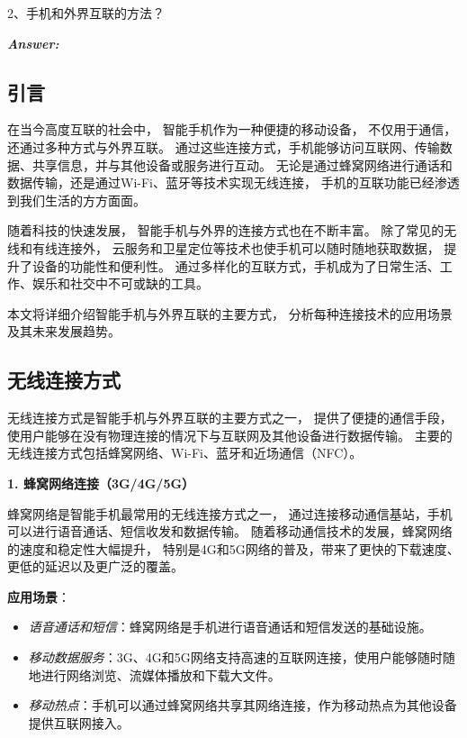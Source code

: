 \documentclass[12pt]{article}
\newenvironment{Answer}{
  \vspace{12pt}
  {\large\textbf{\textit{\hspace{-12pt}Answer:}}}\par
  \vspace{8pt}
} {\vspace{24pt}}
\begin{document}
\begin{question}{}{}
2、手机和外界互联的方法？
\end{question}
\begin{Answer}

\subsection*{引言}\noindent

在当今高度互联的社会中，
智能手机作为一种便捷的移动设备，
不仅用于通信，还通过多种方式与外界互联。
通过这些连接方式，手机能够访问互联网、传输数据、共享信息，并与其他设备或服务进行互动。
无论是通过蜂窝网络进行通话和数据传输，还是通过Wi-Fi、蓝牙等技术实现无线连接，
手机的互联功能已经渗透到我们生活的方方面面。

随着科技的快速发展，
智能手机与外界的连接方式也在不断丰富。
除了常见的无线和有线连接外，
云服务和卫星定位等技术也使手机可以随时随地获取数据，
提升了设备的功能性和便利性。
通过多样化的互联方式，手机成为了日常生活、工作、娱乐和社交中不可或缺的工具。

本文将详细介绍智能手机与外界互联的主要方式，
分析每种连接技术的应用场景及其未来发展趋势。

\subsection*{无线连接方式}\noindent

无线连接方式是智能手机与外界互联的主要方式之一，
提供了便捷的通信手段，
使用户能够在没有物理连接的情况下与互联网及其他设备进行数据传输。
主要的无线连接方式包括蜂窝网络、Wi-Fi、蓝牙和近场通信（NFC）。

\noindent\textbf{1. 蜂窝网络连接（3G/4G/5G）}\noindent

蜂窝网络是智能手机最常用的无线连接方式之一，
通过连接移动通信基站，手机可以进行语音通话、短信收发和数据传输。
随着移动通信技术的发展，蜂窝网络的速度和稳定性大幅提升，
特别是4G和5G网络的普及，带来了更快的下载速度、更低的延迟以及更广泛的覆盖。

\textbf{应用场景}：
\begin{itemize}
    \item \textit{语音通话和短信}：蜂窝网络是手机进行语音通话和短信发送的基础设施。
    \item \textit{移动数据服务}：3G、4G和5G网络支持高速的互联网连接，使用户能够随时随地进行网络浏览、流媒体播放和下载大文件。
    \item \textit{移动热点}：手机可以通过蜂窝网络共享其网络连接，作为移动热点为其他设备提供互联网接入。
\end{itemize}


\end{Answer}
\end{document}
